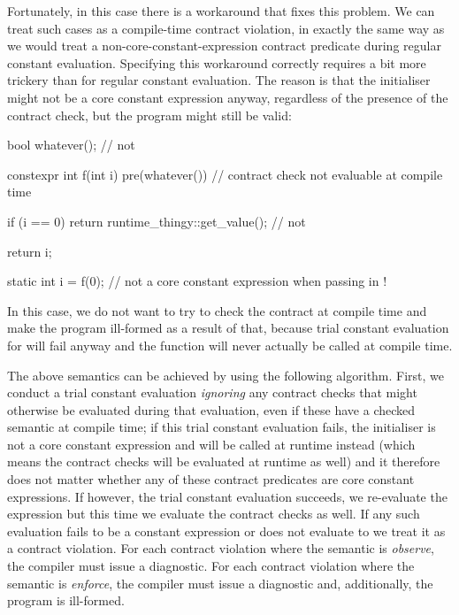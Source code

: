 Fortunately, in this case there is a workaround that fixes this problem. We can treat such cases as a compile-time contract violation, in exactly the same way as we would treat a non-core-constant-expression contract predicate during regular constant evaluation. Specifying this workaround correctly requires a bit more trickery than for regular constant evaluation. The reason is that the initialiser might not be a core constant expression anyway, regardless of the presence of the contract check, but the program might still be valid:

\begin{codeblock}
bool whatever();     // not 

constexpr int f(int i)
  pre(whatever())  // contract check not evaluable at compile time
{
  if (i == 0)
    return runtime_thingy::get_value();  // not 

  return i;
}

static int i = f(0);  // not a core constant expression when passing in !
\end{codeblock}

In this case, we do not want to try to check the contract at compile time and make the program ill-formed as a result of that, because trial constant evaluation for  will fail anyway and the function will never actually be called at compile time.

The above semantics can be achieved by using the following algorithm. First, we conduct a trial constant evaluation \emph{ignoring} any contract checks that might otherwise be evaluated during that evaluation, even if these have a checked semantic at compile time; if this trial constant evaluation fails, the initialiser is not a core constant expression and will be called at runtime instead (which means the contract checks will be evaluated at runtime as well) and it therefore does not matter whether any of these contract predicates are core constant expressions. If however, the trial constant evaluation succeeds, we re-evaluate the expression but this time we evaluate the contract checks as well. If any such evaluation fails to be a constant expression or does not evaluate to  we treat it as a contract violation. For each contract violation where the semantic is \emph{observe}, the compiler must issue a diagnostic.   For each contract violation where the semantic is \emph{enforce}, the compiler must issue a diagnostic and, additionally, the program is ill-formed.

